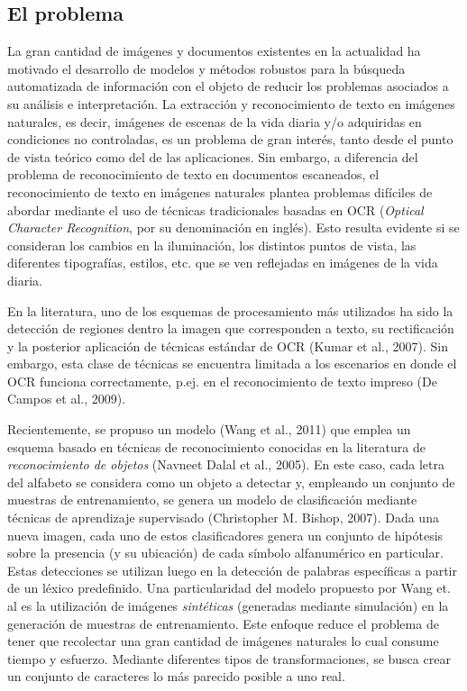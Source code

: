 \subsection{El problema}

	La gran cantidad de imágenes y documentos existentes en la actualidad ha motivado el desarrollo de modelos y métodos robustos para la búsqueda automatizada de información con el objeto de reducir los problemas asociados a su análisis e interpretación. La extracción y reconocimiento de texto en imágenes naturales, es decir, imágenes de escenas de la vida diaria y/o adquiridas en condiciones no controladas, es un problema de gran interés, tanto desde el punto de vista teórico como del de las aplicaciones.  Sin embargo, a diferencia del problema de reconocimiento de texto en documentos escaneados, el reconocimiento de texto en imágenes naturales plantea problemas difíciles de abordar mediante el uso de técnicas tradicionales basadas en OCR (\textit{Optical Character Recognition}, por su denominación en inglés). Esto resulta evidente si se consideran los cambios en la iluminación, los distintos puntos de vista, las diferentes tipografías, estilos, etc. que se ven reflejadas en imágenes de la vida diaria.

	En la literatura, uno de los esquemas de procesamiento más utilizados ha sido la detección de regiones dentro la imagen que corresponden a texto, su rectificación y la posterior aplicación de técnicas estándar de OCR (Kumar et al., 2007). Sin embargo, esta clase de técnicas se encuentra limitada a los escenarios en donde el OCR funciona correctamente, p.ej. en el reconocimiento de texto impreso (De Campos et al., 2009).

	Recientemente, se propuso un modelo (Wang et al., 2011) que emplea un esquema basado en técnicas de reconocimiento conocidas en la literatura de \textit{reconocimiento de objetos} (Navneet Dalal et al., 2005). En este caso, cada letra del alfabeto se considera como un objeto a detectar y, empleando un conjunto de muestras de entrenamiento, se genera un modelo de clasificación mediante técnicas de aprendizaje supervisado (Christopher M. Bishop, 2007). Dada una nueva imagen, cada uno de estos clasificadores genera un conjunto de hipótesis sobre la presencia (y su ubicación) de cada símbolo alfanumérico en particular. Estas detecciones se utilizan luego en la detección de palabras específicas a partir de un léxico predefinido. Una particularidad del modelo propuesto por Wang et. al es la utilización de imágenes \textit{sintéticas} (generadas mediante simulación) en la generación de muestras de entrenamiento. Este enfoque reduce el problema de tener que recolectar una gran cantidad de imágenes naturales lo cual consume tiempo y esfuerzo. Mediante diferentes tipos de transformaciones, se busca crear un conjunto de caracteres lo más parecido posible a uno real.
	